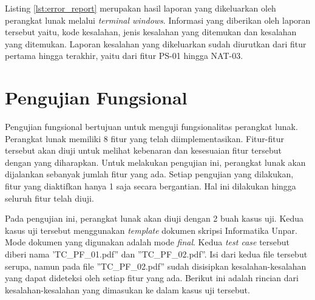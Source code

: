 Listing \ref{lst:error_report} merupakan hasil laporan yang dikeluarkan oleh perangkat lunak melalui \textit{terminal windows}. Informasi yang diberikan oleh laporan tersebut yaitu, kode kesalahan, jenis kesalahan yang ditemukan dan kesalahan yang ditemukan. Laporan kesalahan yang dikeluarkan sudah diurutkan dari fitur pertama hingga terakhir, yaitu dari fitur PS-01 hingga NAT-03.

\section{Pengujian Fungsional}
\label{PengFung}
Pengujian fungsional bertujuan untuk menguji fungsionalitas perangkat lunak. Perangkat lunak memiliki 8 fitur yang telah diimplementasikan. Fitur-fitur tersebut akan diuji untuk melihat kebenaran dan kesesuaian fitur tersebut dengan yang diharapkan. Untuk melakukan pengujian ini, perangkat lunak akan dijalankan sebanyak jumlah fitur yang ada. Setiap pengujian yang dilakukan, fitur yang diaktifkan hanya 1 saja secara bergantian. Hal ini dilakukan hingga seluruh fitur telah diuji.

Pada pengujian ini, perangkat lunak akan diuji dengan 2 buah kasus uji. Kedua kasus uji tersebut menggunakan \textit{template} dokumen skripsi Informatika Unpar. Mode dokumen yang digunakan adalah mode \textit{final}. Kedua \textit{test case} tersebut diberi nama 'TC\_PF\_01.pdf'' dan ''TC\_PF\_02.pdf''. Isi dari kedua file tersebut serupa, namun pada file ''TC\_PF\_02.pdf'' sudah disisipkan kesalahan-kesalahan yang dapat dideteksi oleh setiap fitur yang ada. Berikut ini adalah rincian dari kesalahan-kesalahan yang dimasukan ke dalam kasus uji tersebut.

